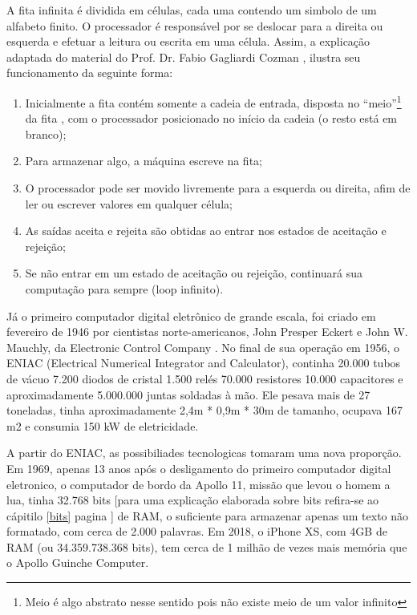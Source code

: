 A fita infinita é dividida em células, cada uma contendo um simbolo de um alfabeto finito. O processador é responsável por se deslocar para a direita ou esquerda e efetuar a leitura ou escrita em uma célula. Assim, a explicação adaptada do material do Prof. Dr. Fabio Gagliardi Cozman \cite{7}, ilustra seu funcionamento da seguinte forma:
\begin{enumerate}
  \item Inicialmente a fita contém somente a cadeia de entrada, disposta no “meio”\footnote{Meio é algo abstrato nesse sentido pois não existe meio de um valor infinito} da fita , com o processador posicionado no início da cadeia (o resto está em branco);
  \item Para armazenar algo, a máquina escreve na fita;
  \item O processador pode ser movido livremente para a esquerda ou direita, afim de ler ou escrever valores em qualquer célula;
  \item As saídas aceita e rejeita são obtidas ao entrar nos estados de aceitação e rejeição;
  \item Se não entrar em um estado de aceitação ou rejeição, continuará sua computação para sempre (loop infinito).
\end{enumerate}

Já o primeiro computador digital eletrônico de grande escala, foi criado em fevereiro de 1946 por cientistas norte-americanos, John Presper Eckert e John W. Mauchly, da Electronic Control Company . No final de sua operação em 1956, o ENIAC (Electrical Numerical Integrator and Calculator), continha 20.000 tubos de vácuo 7.200 diodos de cristal 1.500 relés 70.000 resistores 10.000 capacitores e aproximadamente 5.000.000 juntas soldadas à mão. Ele pesava mais de 27 toneladas, tinha aproximadamente 2,4m * 0,9m * 30m de tamanho, ocupava 167 m2 e consumia 150 kW de eletricidade. \cite{2}

A partir do ENIAC, as possibiliades tecnologicas tomaram uma nova proporção. Em 1969, apenas 13 anos após o desligamento do primeiro computador digital eletronico, o computador de bordo da Apollo 11, missão que levou o homem a lua, tinha 32.768 bits [para uma explicação elaborada sobre bits refira-se ao cápitilo \ref{bits} pagina \pageref{bits}] de RAM, o suficiente para armazenar apenas um texto não formatado, com cerca de 2.000 palavras. Em 2018, o iPhone XS, com 4GB de RAM (ou 34.359.738.368 bits), tem cerca de 1 milhão de vezes mais memória que o Apollo Guinche Computer. \cite{5}

